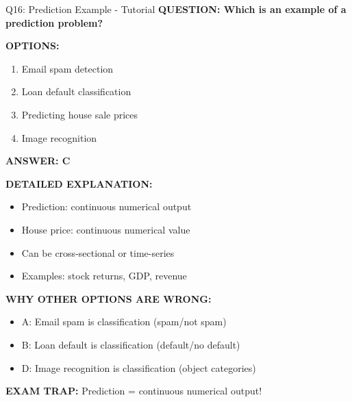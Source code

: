 \documentclass[8pt]{beamer}
\begin{document}
	\begin{frame}{Q16: Prediction Example - Tutorial}
		\fontsize{6.5}{7.5}\selectfont
		\textbf{QUESTION: Which is an example of a prediction problem?}
		
		\vspace{0.1cm}
		\textbf{OPTIONS:}
		\begin{enumerate}
			\item Email spam detection
			\item Loan default classification
			\item Predicting house sale prices
			\item Image recognition
		\end{enumerate}
		
		\vspace{0.1cm}
		\textcolor{myblue}{\textbf{ANSWER: C}}
		
		\vspace{0.1cm}
		\textbf{DETAILED EXPLANATION:}
		\begin{itemize}
			\item Prediction: continuous numerical output
			\item House price: continuous numerical value
			\item Can be cross-sectional or time-series
			\item Examples: stock returns, GDP, revenue
		\end{itemize}
		
		\vspace{0.1cm}
		\textcolor{myred}{\textbf{WHY OTHER OPTIONS ARE WRONG:}}
		\begin{itemize}
			\item \textcolor{myred}{A:} Email spam is classification (spam/not spam)
			\item \textcolor{myred}{B:} Loan default is classification (default/no default)
			\item \textcolor{myred}{D:} Image recognition is classification (object categories)
		\end{itemize}
		
		\textcolor{myred}{\textbf{EXAM TRAP:}} Prediction = \textcolor{myblue}{continuous numerical output}!
	\end{frame}
	
\end{document}
